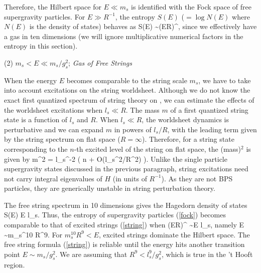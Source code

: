 Therefore, the Hilbert space for $E \ll m_s$ is identified
with the Fock space of free supergravity particles. 
For $E \gg R^{-1}$, the
entropy $S(E)$ ($= \log N(E)$ where $N(E)$ 
is the density of states) behaves as
%
\beq
   S(E) \sim (ER)^{},
 \label{fock}
\eeq
since we effectively have a gas in ten dimensions (we will ignore
multiplicative numerical factors in the entropy in this section).

\medskip
\noindent
(2) $ m_s < E \ll  m_s/g_s^2 $; {\it Gas of Free Strings}

\smallskip

When the energy $E$ becomes comparable to the string scale $m_s$, we
have to take into account excitations on the string worldsheet.
Although we do not know the exact first quantized spectrum 
of string theory on \ads, 
we can estimate the effects of the worldsheet excitations
when $l_s \ll R$.
The mass $m$ of a first quantized string state is a function of 
$l_s$ and $R$.  When $l_s \ll R$, the worldsheet dynamics is 
perturbative and we can expand $m$ in powers of $l_s/R$, with the
leading term given by the string spectrum on flat space 
($R = \infty$). Therefore, for a string state corresponding to the
$n$-th excited level of the string on flat space,
the (mass)$^2$ is given by
\beq
     m^2 = l_s^{-2} \left( n + O(l_s^2/R^2) \right).
\eeq
Unlike the single particle supergravity states discussed in the previous
paragraph, string excitations need  not carry integral
eigenvalues of $H$ (in units of $R^{-1}$). As they
are not BPS particles, they are generically 
unstable in string perturbation theory. 

The free string spectrum in 10 dimensions gives
the Hagedorn density of states 
\beq
  S(E) \simeq  E l_s.
\label{string}
\eeq
Thus, the entropy of supergravity particles (\ref{fock})
becomes comparable to that of excited strings (\ref{string})
when
\beq
 (ER)^{} \sim E l_s, 
\eeq
namely 
\beq
E \sim  m_s^{10}  R^9.
\eeq 
For $ m_s^{10}  R^9 < E $, excited strings dominate
the Hilbert space. 
The free string formula (\ref{string}) 
is reliable until the energy hits another transition
point $E \sim m_s/g_s^2 $. 
We are assuming that $R^9 < l_s^9/g_s^2$, which is true in the 
't Hooft region. 

